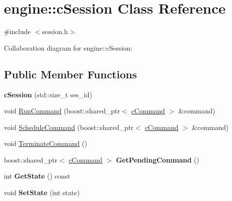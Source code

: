 \hypertarget{classengine_1_1cSession}{\section{engine\-:\-:c\-Session Class Reference}
\label{classengine_1_1cSession}
}


{\ttfamily \#include $<$session.\-h$>$}



Collaboration diagram for engine\-:\-:c\-Session\-:
\subsection*{Public Member Functions}
\begin{DoxyCompactItemize}
\item 
\hypertarget{classengine_1_1cSession_ac84db9690073b0d7cd90b000b8c0e898}{{\bfseries c\-Session} (std\-::size\-\_\-t ses\-\_\-id)}\label{classengine_1_1cSession_ac84db9690073b0d7cd90b000b8c0e898}

\item 
void \hyperlink{classengine_1_1cSession_ab8f8f48c8c2baeec48c46e039105fee9}{Run\-Command} (boost\-::shared\-\_\-ptr$<$ \hyperlink{classengine_1_1cCommand}{c\-Command} $>$ \&command)
\item 
void \hyperlink{classengine_1_1cSession_af7905e76577cecec7e01a8f2967f371b}{Schedule\-Command} (boost\-::shared\-\_\-ptr$<$ \hyperlink{classengine_1_1cCommand}{c\-Command} $>$ \&command)
\item 
void \hyperlink{classengine_1_1cSession_af1a1747cd7020bd4bfce782bf1ffec5d}{Terminate\-Command} ()
\item 
\hypertarget{classengine_1_1cSession_abeb784f7ce34d63adda91d460f2add64}{boost\-::shared\-\_\-ptr$<$ \hyperlink{classengine_1_1cCommand}{c\-Command} $>$ {\bfseries Get\-Pending\-Command} ()}\label{classengine_1_1cSession_abeb784f7ce34d63adda91d460f2add64}

\item 
\hypertarget{classengine_1_1cSession_a4d5cfbd1a1a5d1ff022fd4915b256f4f}{int {\bfseries Get\-State} () const }\label{classengine_1_1cSession_a4d5cfbd1a1a5d1ff022fd4915b256f4f}

\item 
\hypertarget{classengine_1_1cSession_ac70dfa95b25fed14a6ca32df68cf1300}{void {\bfseries Set\-State} (int state)}\label{classengine_1_1cSession_ac70dfa95b25fed14a6ca32df68cf1300}

\end{DoxyCompactItemize}
